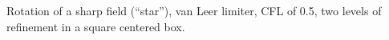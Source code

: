 Rotation of a sharp field (``star''), van Leer limiter, CFL of 0.5, two levels of refinement in a square centered box.
